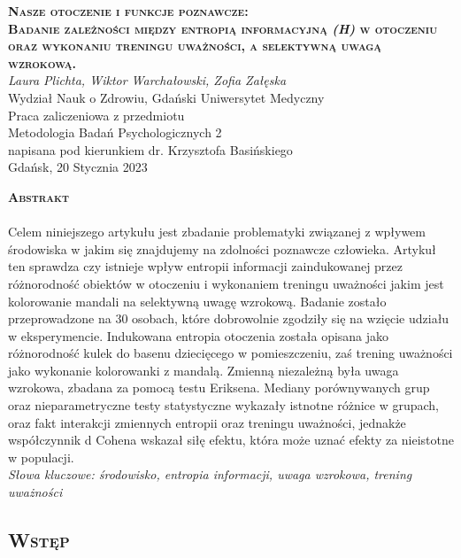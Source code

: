 \documentclass[12pt,a4paper,final,oneside,onecolumn,titlepage]{article}
\begin{document}
\pagestyle{fancy}
\fancyhead{}
\fancyfoot{}
\rhead{\thepage}

\begin{titlepage}
  \thispagestyle{empty}
  \rhead{\thepage}
  \begin{center}
  \vspace*{1cm}
  \Large
  \textbf{\textsc{Nasze otoczenie i funkcje poznawcze:\\ Badanie zależności między entropią informacyjną \textit{(H)} w otoczeniu oraz wykonaniu treningu uważności, a selektywną uwagą wzrokową.\\}}
  \vspace{1.5cm}
  \textit{Laura Plichta, Wiktor Warchałowski, Zofia Załęska\\}
  Wydział Nauk o Zdrowiu, Gdański Uniwersytet Medyczny\\
  \vspace{3cm}
  Praca zaliczeniowa z przedmiotu \\ Metodologia Badań Psychologicznych 2 \\ napisana pod kierunkiem dr. Krzysztofa Basińskiego\\
  \vspace{3cm}
  Gdańsk, 20 Stycznia 2023
  \end{center}
\end{titlepage}
\begin{center}
  \vspace*{0.5cm}
  \large{\textbf{\textsc{Abstrakt}}}
\end{center}
\paragraph{}
Celem niniejszego artykułu jest zbadanie problematyki związanej z wpływem środowiska w jakim się znajdujemy na zdolności poznawcze człowieka. Artykuł ten sprawdza czy istnieje wpływ entropii informacji zaindukowanej przez różnorodność obiektów w otoczeniu i wykonaniem treningu uważności jakim jest kolorowanie mandali na selektywną uwagę wzrokową. Badanie zostało przeprowadzone na 30 osobach, które dobrowolnie zgodziły się na wzięcie udziału w eksperymencie. Indukowana entropia otoczenia została opisana jako różnorodność kulek do basenu dziecięcego w pomieszczeniu, zaś trening uważności jako wykonanie kolorowanki z mandalą. Zmienną niezależną była uwaga wzrokowa, zbadana za pomocą testu Eriksena. Mediany porównywanych grup oraz nieparametryczne testy statystyczne wykazały istnotne różnice w grupach, oraz fakt interakcji zmiennych entropii oraz treningu uważności, jednakże współczynnik d Cohena wskazał siłę efektu, która może uznać efekty za nieistotne w populacji.
\\
\textit{Słowa kluczowe: środowisko, entropia informacji, uwaga wzrokowa, trening uważności}
\newpage
\begin{center}
\section*{\large{\textbf{\textsc{Wstęp}}}}
\end{center}
\end{document}
